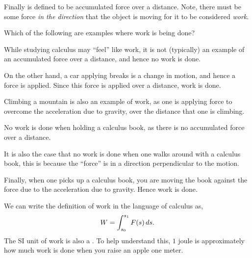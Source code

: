 \documentclass{ximera}
\begin{document}
Finally  is defined to be accumulated force over a
distance. Note, there must be some force \textit{in the direction}
that the object is moving for it to be considered \textit{work}.
\begin{question}
  Which of the following are examples where work is being done?
  \begin{selectAll}
  \end{selectAll}
  \begin{feedback}
    While studying calculus may ``feel'' like work, it is not
    (typically) an example of an accumulated force over a distance,
    and hence no work is done.

    On the other hand, a car applying breaks is a change in motion, and
    hence a force is applied. Since this force is applied over a
    distance, work is done.

    Climbing a mountain is also an example of work, as one is applying
    force to overcome the acceleration due to gravity, over the
    distance that one is climbing.

    No work is done when holding a calculus book, as there is no
    accumulated force over a distance.

    It is also the case that no work is done when one walks around
    with a calculus book, this is because the ``force'' is in a
    direction perpendicular to the motion.

    Finally, when one picks up a calculus book, you are moving the
    book against the force due to the acceleration due to
    gravity. Hence work is done.
  \end{feedback}
\end{question}
We can write the definition of work in the language of calculus as,
\[
W = \int_{s_0}^{s_1} F(s) \,d s.
\]
The SI unit of work is also a . To help understand this,
$1$ joule is approximately how much work is done when you raise an
apple one meter.
\end{document}
